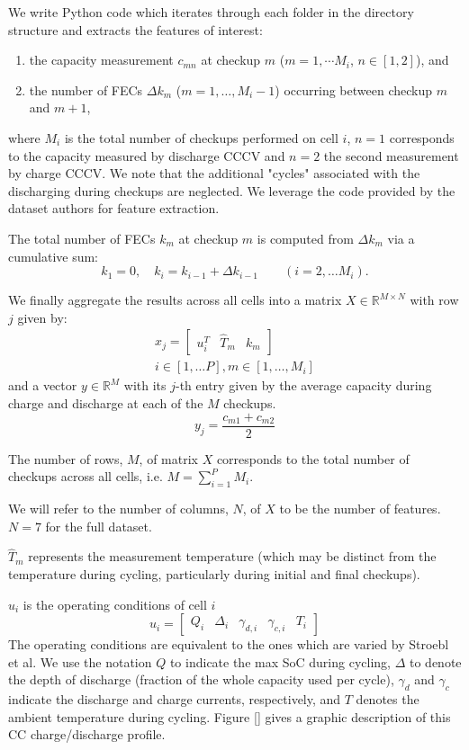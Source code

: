 \documentclass[conference]{IEEEtran}
\newcommand{\mat}[1]{\begin{bmatrix} #1 \end{bmatrix}}
\newcommand{\R}{\mathbb{R}}
\begin{document}
We write Python code which iterates through each folder in the directory
structure and extracts the features of interest:
\begin{enumerate}
    \item the capacity measurement $c_{mn}$ at checkup $m$
        ($m=1,\cdots M_i$, $n\in[1, 2]$), and
    \item the number of FECs $\Delta k_m$ ($m=1,\dots, M_i - 1$) occurring
        between checkup $m$ and $m+1$,
\end{enumerate}

where $M_i$ is the total number of checkups performed on cell $i$,
$n=1$ corresponds to the capacity measured by discharge CCCV and $n=2$
the second measurement by charge CCCV. We note that the additional "cycles"
associated with the discharging during checkups are neglected. We leverage
the code provided by the dataset authors for feature extraction.

The total number of FECs $k_m$ at checkup $m$ is computed from
$\Delta k_m$ via a cumulative sum:
\begin{equation*}
    k_1 = 0, \quad k_{i} = k_{i-1} + \Delta k_{i-1} \qquad (i=2,\dots M_i).
\end{equation*}

We finally aggregate the results across all cells into a matrix $X\in\R^{M\times N}$
with row $j$ given by:
\begin{align*}
    x_j = \mat{
        u_i^T & \hat{T}_m & k_m
    } \\ i\in[1,\dots P], m\in[1,\dots,M_i]
\end{align*}
and a vector $y\in\R^M$ with its $j$-th entry given
by the average capacity during charge and discharge at each of
the $M$ checkups.
\begin{equation*}
    y_j = \frac{c_{m1} + c_{m2}}{2}
\end{equation*}

The number of rows, $M$, of matrix $X$ corresponds to the 
total number of checkups across all cells, i.e. $M = \sum_{i=1}^{P} M_i$.

We will refer to the number of columns, $N$, of $X$ to be the 
number of features. $N=7$ for the full dataset.

$\hat{T}_m$ represents the measurement temperature (which may be distinct
from the temperature during cycling, particularly during initial and final checkups).

$u_i$ is the operating conditions of cell $i$
\begin{equation*}
    u_i = \mat{Q_i & \Delta_i & \gamma_{d,i} & \gamma_{c,i} & T_i}
\end{equation*}
The operating conditions are equivalent to the ones which are varied
by Stroebl et al. We use the notation $Q$ to indicate the max SoC
during cycling, $\Delta$ to denote the depth of discharge (fraction of
the whole capacity used per cycle), $\gamma_d$ and $\gamma_c$ indicate
the discharge and charge currents, respectively, and $T$ denotes the ambient
temperature during cycling. 
Figure [] gives a graphic description of this CC charge/discharge profile.
\end{document}
